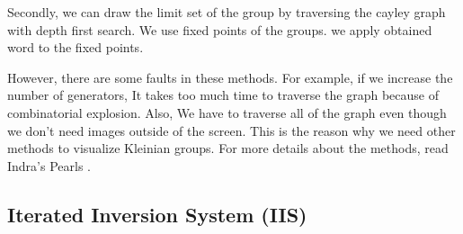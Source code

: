 Secondly, we can draw the limit set of the group by traversing the
cayley graph with depth first search.
We use fixed points of the groups.
we apply obtained word to the fixed points.

However, there are some faults in these methods.
For example, if we increase the number of generators,
It takes too much time to traverse the graph because of
combinatorial explosion.
Also, We have to traverse all of the graph
even though we don't need images outside of the screen.
This is the reason why we need other methods to visualize Kleinian
groups.
For more details about the methods, read Indra's Pearls \cite{MumfordSeriesWright200204}.


\subsection{Iterated Inversion System (IIS)}

